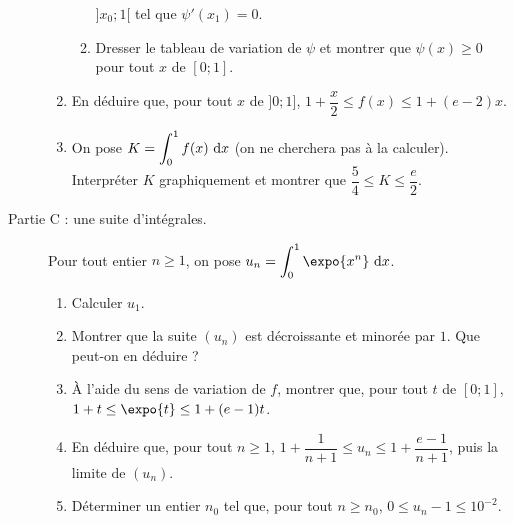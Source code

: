 \begin{exo}
\begin{description}
\begin{enumerate}
\begin{enumerate}
                                          $]x_0 ; 1[$ tel que $\psi'(x_1) = 0$.
                                    \item Dresser le tableau de variation de $\psi$ et montrer que $\psi(x) \geq 0$ pour tout $x$ de $[0 ; 1]$.
                              \end{enumerate}
                        \item En d\'eduire que, pour tout $x$ de $]0 ; 1]$, $1 + \dfrac{x}{2} \leq f(x) \leq 1 + (e - 2)x$.
                        \item On pose $K = \displaystyle \int_0^1 f(x) ~\mathrm{d}x$ (on ne cherchera pas \`a la calculer).
                              Interpr\'eter $K$ graphiquement et montrer que $\dfrac{5}{4} \leq K \leq \dfrac{e}{2}$.
                  \end{enumerate}
            \item[Partie C : une suite d'int\'egrales.]
                  Pour tout entier $n \geq 1$, on pose $\displaystyle u_n = \int_0^1 \expo{x^n} \dx$.
                  \begin{enumerate}
                        \item Calculer $u_1$.
                        \item Montrer que la suite $(u_n)$ est d\'ecroissante et minor\'ee par $1$. Que peut-on en d\'eduire ?
                        \item \`A l'aide du sens de variation de $f$, montrer que, pour tout $t$ de $[0 ; 1]$,
                              $1 + t \leq \expo{t} \leq 1 + (e - 1)t$.
                        \item En d\'eduire que, pour tout $n \geq 1$,
                              $1 + \dfrac{1}{n+1} \leq u_n \leq 1 + \dfrac{e-1}{n+1}$, puis la limite de $(u_n)$.
                        \item D\'eterminer un entier $n_0$ tel que, pour tout $n \geq n_0$, $0 \leq u_n - 1 \leq 10^{-2}$.
                  \end{enumerate}
      \end{description}
\end{exo}
